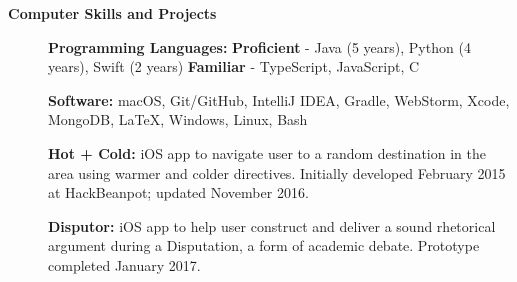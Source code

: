 \documentclass[letterpaper,10.8pt]{article}
\newcommand{\resheading}[1]{{\large \colorbox{mygrey}{\begin{minipage}{\textwidth}{\textbf{#1 \vphantom{p\^{E}}}}\end{minipage}}}}
\begin{document}
\resheading{Computer Skills and Projects}
{\small
\begin{description}
	\item[] \hspace{0.03in} \textbf{Programming Languages:} {\footnotesize \textbf{Proficient} - Java (5 years), Python (4 years), Swift (2 years) \enspace \textbf{Familiar} - TypeScript, JavaScript, C}
	\item[] \hspace{0.03in} \textbf{Software:} {\footnotesize macOS, Git/GitHub, IntelliJ IDEA, Gradle, WebStorm, Xcode, MongoDB, \LaTeX, Windows, Linux, Bash}
	\item[] \hspace{0.03in} \textbf{Hot + Cold:} {\footnotesize iOS app to navigate user to a random destination in the area using warmer and colder directives. Initially developed February 2015 at HackBeanpot; updated November 2016.}
	\item[] \hspace{0.03in} \textbf{Disputor:} {\footnotesize iOS app to help user construct and deliver a sound rhetorical argument during a Disputation, a form of academic debate.  Prototype completed January 2017.}
\end{description}}
\end{document}
